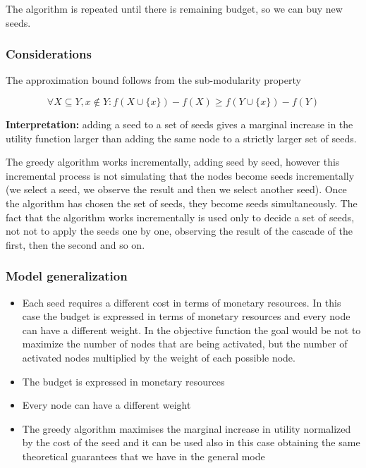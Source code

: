 \documentclass[10pt,a4paper]{article}
\begin{document}
The algorithm is repeated until there is remaining budget, so we can buy new seeds.

\subsubsection{Considerations}\label{considerations-1}

The approximation bound follows from the sub-modularity property

$$\forall X \subseteq Y, x \notin Y: f(X \cup \{x\}) - f(X) \ge f(Y \cup \{x\}) - f(Y)$$

\textbf{Interpretation:} adding a seed to a set of seeds gives a marginal increase in the utility function larger than adding the same node to a strictly larger set of seeds.

The greedy algorithm works incrementally, adding seed by seed, however this incremental process is not simulating that the nodes become seeds incrementally (we select a seed, we observe the result and then we select another seed). Once the algorithm has chosen the set of seeds, they become seeds simultaneously. The fact that the algorithm works incrementally is used only to decide a set of seeds, not not to apply the seeds one by one, observing the result of the cascade of the first, then the second and so on.

\subsubsection{Model generalization}\label{model-generalization}

\begin{itemize}

\item Each seed requires a different cost in terms of monetary resources. In this case the budget is expressed in terms of monetary resources and every node can have a different weight. In the objective function the goal would be not to maximize the number of nodes that are being activated, but the number of activated nodes multiplied by the weight of each possible node.
\item The budget is expressed in monetary resources
\item Every node can have a different weight
\item The greedy algorithm maximises the marginal increase in utility normalized by the cost of the seed and it can be used also in this case obtaining the same theoretical guarantees that we have in the general mode
\end{itemize}
\end{document}

